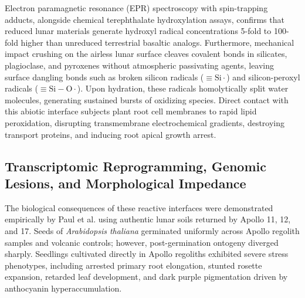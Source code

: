 Electron paramagnetic resonance (EPR) spectroscopy with spin-trapping adducts, alongside chemical terephthalate hydroxylation assays, confirms that reduced lunar materials generate hydroxyl radical concentrations 5-fold to 100-fold higher than unreduced terrestrial basaltic analogs\cite{hendrix2024reactivity,turci2015mechanistic,wallace2022assessment}. Furthermore, mechanical impact crushing on the airless lunar surface cleaves covalent bonds in silicates, plagioclase, and pyroxenes without atmospheric passivating agents, leaving surface dangling bonds such as broken silicon radicals ($\equiv\!\mathrm{Si}\cdot$) and silicon-peroxyl radicals ($\equiv\!\mathrm{Si}-\mathrm{O}\cdot$)\cite{turci2015mechanistic,hendrix2019measurement}. Upon hydration, these radicals homolytically split water molecules, generating sustained bursts of oxidizing species\cite{hendrix2019measurement,sperl2017influence}. Direct contact with this abiotic interface subjects plant root cell membranes to rapid lipid peroxidation, disrupting transmembrane electrochemical gradients, destroying transport proteins, and inducing root apical growth arrest\cite{ming1989lunar,turci2015mechanistic}.

\subsection{Transcriptomic Reprogramming, Genomic Lesions, and Morphological Impedance}
\label{subsec:transcriptomics_genomics}

The biological consequences of these reactive interfaces were demonstrated empirically by Paul et al.\cite{paul2022plants} using authentic lunar soils returned by Apollo 11, 12, and 17. Seeds of \textit{Arabidopsis thaliana} germinated uniformly across Apollo regolith samples and volcanic controls; however, post-germination ontogeny diverged sharply\cite{paul2022plants}. Seedlings cultivated directly in Apollo regoliths exhibited severe stress phenotypes, including arrested primary root elongation, stunted rosette expansion, retarded leaf development, and dark purple pigmentation driven by anthocyanin hyperaccumulation\cite{paul2022plants}.

